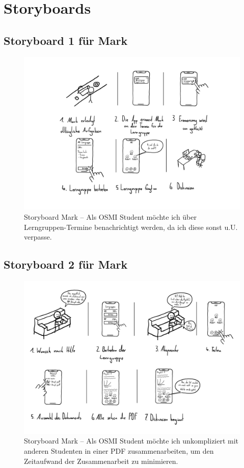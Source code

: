 \documentclass{article}
\begin{document}
\newpage

\section{Storyboards}

\subsection{Storyboard 1 für Mark}

\begin{figure}[h]
	\includegraphics[width=\textwidth]{storyboard-1-mark}
	\centering
	\caption{Storyboard Mark – Als OSMI Student möchte ich über Lerngruppen-Termine benachrichtigt werden, da ich diese sonst u.U. verpasse.}
\end{figure}

\newpage

\subsection{Storyboard 2 für Mark}

\begin{figure}[h]
	\includegraphics[width=\textwidth]{storyboard-2-mark}
	\centering
	\caption{Storyboard Mark – Als OSMI Student möchte ich unkompliziert mit anderen Studenten in einer PDF zusammenarbeiten, um den Zeitaufwand der Zusammenarbeit zu minimieren.}
\end{figure}
\end{document}
